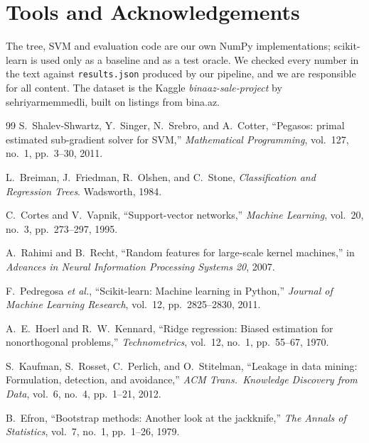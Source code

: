 \documentclass[10pt,twocolumn,a4paper]{article}
\begin{document}
\section*{Tools and Acknowledgements}
The tree, SVM and evaluation code are our own NumPy implementations;
scikit-learn is used only as a baseline and as a test oracle. We checked
every number in the text against \texttt{results.json} produced by our
pipeline, and we are responsible for all content. The dataset is the
Kaggle \emph{binaaz-sale-project} by sehriyarmemmedli, built on listings from
bina.az.

\begin{thebibliography}{99}
S.~Shalev-Shwartz, Y.~Singer, N.~Srebro, and A.~Cotter,
``Pegasos: primal estimated sub-gradient solver for SVM,''
\emph{Mathematical Programming}, vol.~127, no.~1, pp.~3--30, 2011.

L.~Breiman, J.~Friedman, R.~Olshen, and C.~Stone,
\emph{Classification and Regression Trees}. Wadsworth, 1984.

C.~Cortes and V.~Vapnik, ``Support-vector networks,''
\emph{Machine Learning}, vol.~20, no.~3, pp.~273--297, 1995.

A.~Rahimi and B.~Recht, ``Random features for large-scale kernel machines,''
in \emph{Advances in Neural Information Processing Systems 20}, 2007.

F.~Pedregosa \emph{et al.}, ``Scikit-learn: Machine learning in {Python},''
\emph{Journal of Machine Learning Research}, vol.~12, pp.~2825--2830, 2011.

A.~E.~Hoerl and R.~W.~Kennard, ``Ridge regression: Biased estimation for
nonorthogonal problems,'' \emph{Technometrics}, vol.~12, no.~1, pp.~55--67, 1970.

S.~Kaufman, S.~Rosset, C.~Perlich, and O.~Stitelman,
``Leakage in data mining: Formulation, detection, and avoidance,''
\emph{ACM Trans.\ Knowledge Discovery from Data}, vol.~6, no.~4, pp.~1--21, 2012.

B.~Efron, ``Bootstrap methods: Another look at the jackknife,''
\emph{The Annals of Statistics}, vol.~7, no.~1, pp.~1--26, 1979.
\end{thebibliography}
\end{document}
